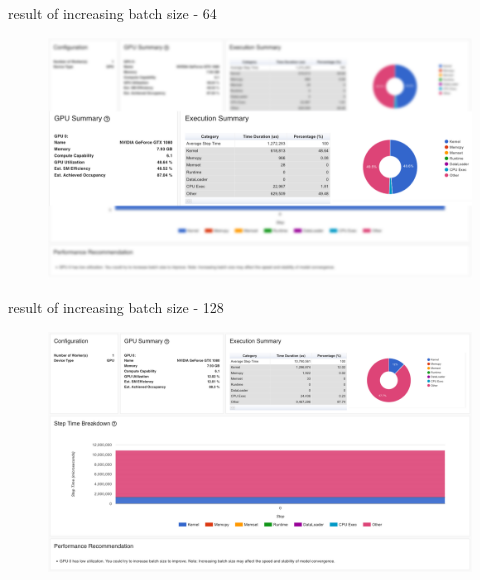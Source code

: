 \documentclass[compress,aspectratio=169]{beamer}
\begin{document}
\begin{frame}{result of increasing batch size - 64}

\begin{center}
    \begin{figure}
        \includegraphics[width=1\textwidth]{../../data/scap_gtx1080_profiler-torch_batch-size-64_14629008_zoom}
    \end{figure}
    \end{center}

\end{frame}


\begin{frame}{result of increasing batch size - 128}

\begin{center}
    \begin{figure}
        \includegraphics[width=1\textwidth]{../../data/scap_gtx1080_profiler-torch_batch-size-128_14633534}
    \end{figure}
    \end{center}

\end{frame}
\end{document}

